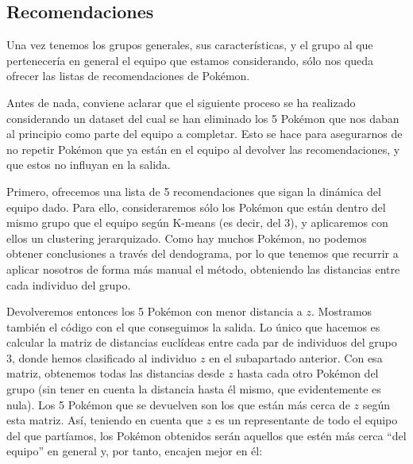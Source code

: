 \documentclass[
  11.8pt,
]{extreport}
\begin{document}
\subsection{Recomendaciones}\label{recomendaciones}

Una vez tenemos los grupos generales, sus características, y el grupo al
que pertenecería en general el equipo que estamos considerando, sólo nos
queda ofrecer las listas de recomendaciones de Pokémon.

Antes de nada, conviene aclarar que el siguiente proceso se ha realizado
considerando un dataset del cual se han eliminado los 5 Pokémon que nos
daban al principio como parte del equipo a completar. Esto se hace para
asegurarnos de no repetir Pokémon que ya están en el equipo al devolver
las recomendaciones, y que estos no influyan en la salida.

Primero, ofrecemos una lista de 5 recomendaciones que sigan la dinámica
del equipo dado. Para ello, consideraremos sólo los Pokémon que están
dentro del mismo grupo que el equipo según K-means (es decir, del 3), y
aplicaremos con ellos un clustering jerarquizado. Como hay muchos
Pokémon, no podemos obtener conclusiones a través del dendograma, por lo
que tenemos que recurrir a aplicar nosotros de forma más manual el
método, obteniendo las distancias entre cada individuo del grupo.

Devolveremos entonces los 5 Pokémon con menor distancia a \(z\).
Mostramos también el código con el que conseguimos la salida. Lo único
que hacemos es calcular la matriz de distancias euclídeas entre cada par
de individuos del grupo 3, donde hemos clasificado al individuo \(z\) en
el subapartado anterior. Con esa matriz, obtenemos todas las distancias
desde \(z\) hasta cada otro Pokémon del grupo (sin tener en cuenta la
distancia hasta él mismo, que evidentemente es nula). Los 5 Pokémon que
se devuelven son los que están más cerca de \(z\) según esta matriz.
Así, teniendo en cuenta que \(z\) es un representante de todo el equipo
del que partíamos, los Pokémon obtenidos serán aquellos que estén más
cerca ``del equipo'' en general y, por tanto, encajen mejor en él:

\vspace{1cm}
\end{document}
